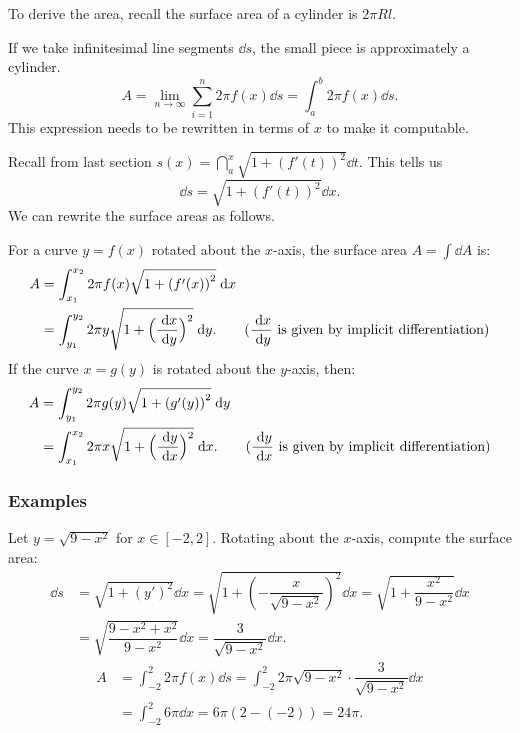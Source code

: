 To derive the area, recall the surface area of a cylinder is $2\pi R l$.

If we take infinitesimal line segments $\dd s$, the small piece is approximately a cylinder.
\[A = \lim_{n\to \infty} \sum_{i=1}^n 2 \pi f(x) \dd s= \int_a^b 2 \pi f(x) \dd s.\]
This expression needs to be rewritten in terms of $x$ to make it computable.

Recall from last section $s(x) = \dint_a^x \sqrt{1 + \left(f'(t)\right)^2} \dd t$. This tells us
\[\dd s = \sqrt{1 + \left(f'(t)\right)^2} \dd x.\]
We can rewrite the surface areas as follows.

\begin{tcolorbox}
    For a curve $y = f(x)$ rotated about the $x$-axis, the surface area $A = \int \dd A$ is:
    \begin{align*}
        A &= \int_{x_1}^{x_2}  2\pi f(x) \sqrt{1 + \left(f'(x)\right)^2} \dd x\\
        &= \int_{y_1}^{y_2} 2\pi y \sqrt{1+\Big(\frac{\dd x}{\dd y}\Big)^2} \dd y. \tag{$\dfrac{\dd x}{\dd y}$ is given by implicit differentiation}
    \end{align*}
    If the curve $x = g(y)$ is rotated about the $y$-axis, then:
    \begin{align*}
        A &= \int_{y_1}^{y_2} 2\pi g(y) \sqrt{1 + \left(g'(y)\right)^2} \dd y\\
        &= \int_{x_1}^{x_2} 2\pi x \sqrt{1+\Big(\frac{\dd y}{\dd x}\Big)^2} \dd x. \tag{$\dfrac{\dd y}{\dd x}$ is given by implicit differentiation}
    \end{align*}
\end{tcolorbox}


\subsubsection{Examples}
\begin{ex} Let $y = \sqrt{9 - x^2}$ for $x \in [-2, 2]$.
    Rotating about the $x$-axis, compute the surface area:
    \begin{align*}
        \dd s &= \sqrt{1 + \left(y'\right)^2} \dd x = \sqrt{1 + \left(-\dfrac{x}{\sqrt{9 - x^2}}\right)^2} \dd x  = \sqrt{1 + \dfrac{x^2}{9 - x^2}} \dd x \\
        &= \sqrt{\dfrac{9 - x^2 + x^2}{9 - x^2}} \dd x  = \dfrac{3}{\sqrt{9 - x^2}} \dd x.
    \end{align*}
    \begin{align*}
        A &= \int_{-2}^2 2\pi f(x) \dd s = \int_{-2}^2 2\pi \sqrt{9 - x^2} \cdot \dfrac{3}{\sqrt{9 - x^2}} \dd x \\
        &= \int_{-2}^2 6\pi \dd x = 6\pi (2 - (-2)) = 24\pi.
    \end{align*}
\end{ex}

